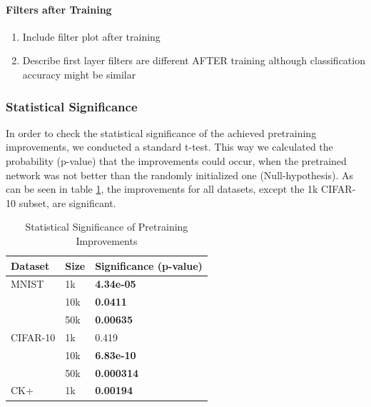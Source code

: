 \documentclass{article}
\begin{document}
      \paragraph{Filters after Training}
        \begin{enumerate}
          \item{Include filter plot after training}
          \item{Describe first layer filters are different AFTER training although classification accuracy might be similar}
        \end{enumerate}

  \subsubsection{Statistical Significance}
    In order to check the statistical significance of the achieved pretraining improvements, we conducted a standard t-test.
    This way we calculated the probability (p-value) that the improvements could occur, when the pretrained network was not better than the randomly initialized one (Null-hypothesis).
    As can be seen in table \ref{table:significance}, the improvements for all datasets, except the 1k CIFAR-10 subset, are significant.

    \begin{table}
      \caption{Statistical Significance of Pretraining Improvements}
      \label{table:significance}
      \centering
      \begin{tabular}{lll}
        \toprule
        Dataset     & Size     & Significance (p-value) \\
        \midrule
        MNIST & 1k  & \textbf{4.34e-05} \\
        & 10k  & \textbf{0.0411} \\
        & 50k  & \textbf{0.00635} \\
        \midrule
        CIFAR-10 & 1k & 0.419 \\
        & 10k & \textbf{6.83e-10} \\
        & 50k & \textbf{0.000314} \\
        \midrule
        CK+     & 1k & \textbf{0.00194} \\
        \bottomrule
      \end{tabular}
    \end{table}
\end{document}
